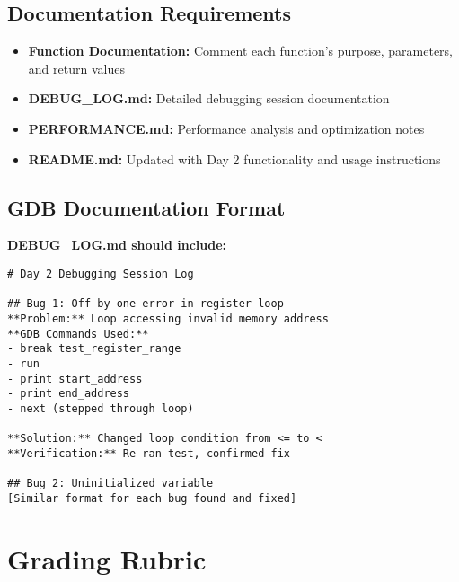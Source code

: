 \documentclass[11pt,a4paper]{article}
\begin{document}
\subsection{Documentation Requirements}
\begin{itemize}
    \item \textbf{Function Documentation:} Comment each function's purpose, parameters, and return values
    \item \textbf{DEBUG\_LOG.md:} Detailed debugging session documentation
    \item \textbf{PERFORMANCE.md:} Performance analysis and optimization notes
    \item \textbf{README.md:} Updated with Day 2 functionality and usage instructions
\end{itemize}

\subsection{GDB Documentation Format}
\textbf{DEBUG\_LOG.md should include:}
\begin{verbatim}
# Day 2 Debugging Session Log

## Bug 1: Off-by-one error in register loop
**Problem:** Loop accessing invalid memory address
**GDB Commands Used:**
- break test_register_range
- run
- print start_address
- print end_address
- next (stepped through loop)

**Solution:** Changed loop condition from <= to <
**Verification:** Re-ran test, confirmed fix

## Bug 2: Uninitialized variable
[Similar format for each bug found and fixed]
\end{verbatim}

\section{Grading Rubric}
\end{document}
